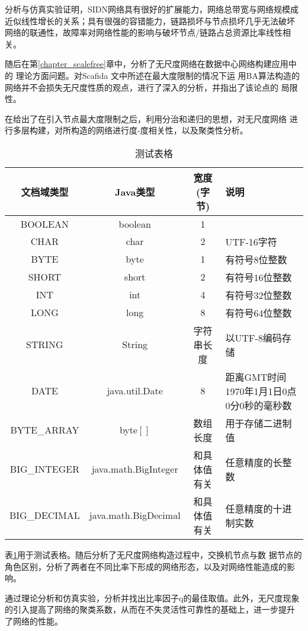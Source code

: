\documentclass[master]{njuthesis}
\begin{document}
分析与仿真实验证明，SIDN网络具有很好的扩展能力，网络总带宽与网络规模成
近似线性增长的关系；具有很强的容错能力，链路损坏与节点损坏几乎无法破坏
网络的联通性，故障率对网络性能的影响与破坏节点/链路占总资源比率线性相关。

随后在第\ref{chapter_scalefree}章中，分析了无尺度网络在数据中心网络构建应用中的
理论方面问题。对Scafida \cite{gyarmati2010scafida}文中所述在最大度限制的情况下运
用BA算法构造的网络并不会损失无尺度性质的观点，进行了深入的分析，并指出了该论点的
局限性。

在给出了在引入节点最大度限制之后，利用分治和递归的思想，对无尺度网络
进行多层构建，对所构造的网络进行度-度相关性，以及聚类性分析。

\begin{table}
  \centering
  \begin{tabular}{cccp{38mm}}
    \toprule
    \textbf{文档域类型} & \textbf{Java类型} & \textbf{宽度(字节)} & \textbf{说明} \\
    \midrule
    BOOLEAN  & boolean &  1  & \\
    CHAR     & char    &  2  & UTF-16字符 \\
    BYTE     & byte    &  1  & 有符号8位整数 \\
    SHORT    & short   &  2  & 有符号16位整数 \\
    INT      & int     &  4  & 有符号32位整数 \\
    LONG     & long    &  8  & 有符号64位整数 \\
    STRING   & String  &  字符串长度  & 以UTF-8编码存储 \\
    DATE     & java.util.Date & 8 & 距离GMT时间1970年1月1日0点0分0秒的毫秒数 \\
    BYTE\_ARRAY & byte$[]$ & 数组长度 & 用于存储二进制值 \\
    BIG\_INTEGER & java.math.BigInteger & 和具体值有关 & 任意精度的长整数 \\
    BIG\_DECIMAL & java.math.BigDecimal & 和具体值有关 & 任意精度的十进制实数 \\
    \bottomrule
  \end{tabular}
  \caption{测试表格}\label{table:test5}
\end{table}

表\ref{table:test5}用于测试表格。随后分析了无尺度网络构造过程中，交换机节点与数
据节点的角色区别，分析了两者在不同比率下形成的网络形态，以及对网络性能造成的影响。

通过理论分析和仿真实验，分析并找出比率因子q的最佳取值。此外，无尺度现象
的引入提高了网络的聚类系数，从而在不失灵活性可靠性的基础上，进一步提升
了网络的性能。
\end{document}
